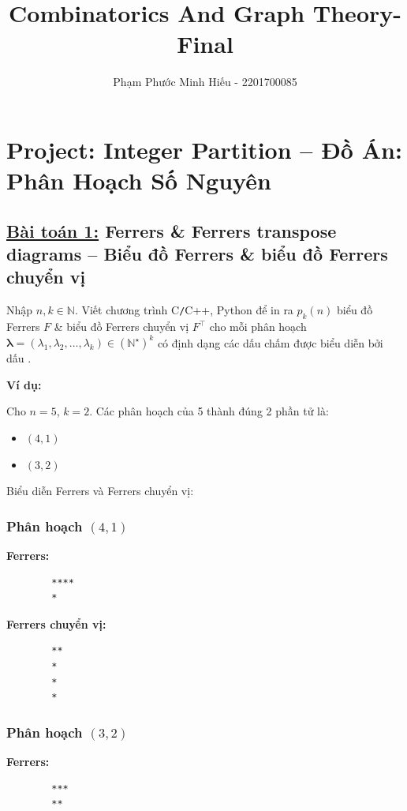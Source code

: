 \documentclass{article}
\title{Combinatorics And Graph Theory-Final}
\author{Phạm Phước Minh Hiếu - 2201700085}
\begin{document}
	\maketitle
	\section*{Project: Integer Partition -- Đồ Án: Phân Hoạch Số Nguyên}
	
	\subsection*{\underline{Bài toán 1:} Ferrers \& Ferrers transpose diagrams -- Biểu đồ Ferrers \& biểu đồ Ferrers chuyển vị}
	
	Nhập $n,k\in\mathbb{N}$. Viết chương trình {\sf C{\tt/}C++, Python} để in ra $p_k(n)$ biểu đồ Ferrers $F$ \& biểu đồ Ferrers chuyển vị $F^\top$ cho mỗi phân hoạch $\boldsymbol{\lambda} = (\lambda_1,\lambda_2,\ldots,\lambda_k)\in(\mathbb{N}^\star)^k$ có định dạng các dấu chấm được biểu diễn bởi dấu {\tt*}.
	
	\textbf{Ví dụ:}
	
	Cho $n = 5$, $k = 2$. Các phân hoạch của 5 thành đúng 2 phần tử là:
	
	\begin{itemize}
		\item $(4,1)$
		\item $(3,2)$
	\end{itemize}
	
	Biểu diễn Ferrers và Ferrers chuyển vị:
	
	\subsubsection*{Phân hoạch $(4,1)$}
	
	\textbf{Ferrers:}
	\begin{Verbatim}
		****
		*
	\end{Verbatim}
	
	\textbf{Ferrers chuyển vị:}
	\begin{Verbatim}
		**
		*
		*
		*
	\end{Verbatim}
	
	\subsubsection*{Phân hoạch $(3,2)$}
	
	\textbf{Ferrers:}
	\begin{Verbatim}
		***
		**
	\end{Verbatim}
	
\end{document}
